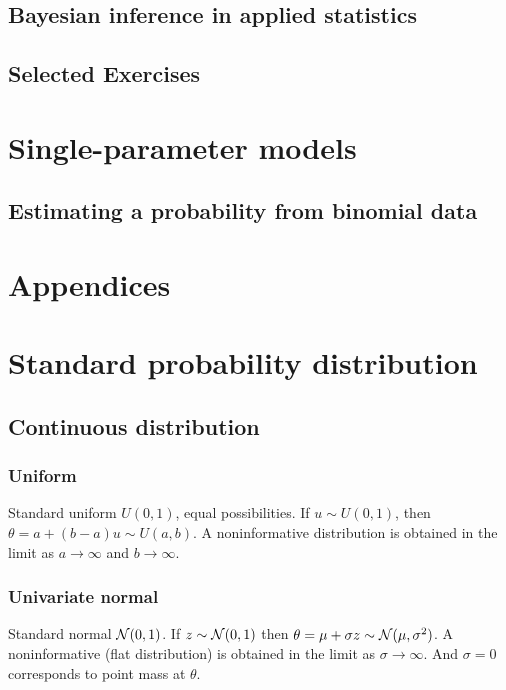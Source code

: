 \documentclass[11pt,a4paper]{article}
\begin{document}
\subsection{Bayesian inference in applied statistics}
\subsection{Selected Exercises}
\section{Single-parameter models}
\subsection{Estimating a probability from binomial data}






















\newpage
\appendix
\section*{Appendices}
\section{Standard probability distribution}
\subsection{Continuous distribution}
\subsubsection*{Uniform}

Standard uniform \(U(0,1)\), equal possibilities. If \(u\sim U(0,1)\), then \(\theta=a+(b-a)u\sim U(a,b)\). A noninformative distribution is obtained in the limit as \(a\to\infty\) and \(b\to\infty\).
\subsubsection*{Univariate normal}

Standard normal \(\mathcal{N}(0,1)\). If \(z\sim\mathcal{N}(0,1)\) then \(\theta=\mu+\sigma z\sim \mathcal{N}(\mu,\sigma^2)\). A noninformative (flat distribution) is obtained in the limit as \(\sigma\to\infty\). And \(\sigma=0\) corresponds to point mass at \(\theta\).
\end{document}
